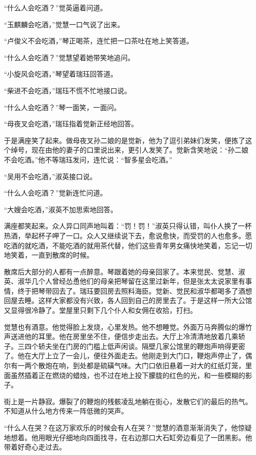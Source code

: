 \par “什么人会吃酒？”觉英逼着问道。
\par “玉麒麟会吃酒，”觉慧一口气说了出来。
\par “卢俊义不会吃酒，”琴正喝茶，连忙把一口茶吐在地上笑答道。
\par “什么人会吃酒？”觉慧望着她带笑地追问。
\par “小旋风会吃酒，”琴望着瑞珏回答道。
\par “柴进不会吃酒，”瑞珏不慌不忙地接口说。
\par “什么人会吃酒？”琴一面笑，一面问。
\par “母夜叉会吃酒，”瑞珏指着觉新正经地回答。
\par 于是满座笑了起来。做母夜叉孙二娘的是觉新，他为了逗引弟妹们发笑，便拣了这个绰号，现在由他的妻子的口里说出来，更引人发笑了。觉新含笑地说：“孙二娘不会吃酒。”他不等瑞珏发问，连忙说：“智多星会吃酒。”
\par “吴用不会吃酒，”淑英接口说。
\par “什么人会吃酒？”觉新连忙问道。
\par “大嫂会吃酒，”淑英不加思索地回答。
\par 满座都笑起来。众人异口同声地叫着：“罚！罚！”淑英只得认错，叫仆人换了一杯热酒，举起杯子呷了一口。众人又继续说下去，愈说愈快，而受罚的人也愈多。愿吃酒的就吃酒，不能吃酒的就用茶代替，他们这些青年男女痛快地笑着，忘记一切地笑着，一直到散席的时候。
\par 散席后大部分的人都有一点醉意。琴跟着她的母亲回家了。本来觉民、觉慧、淑英、淑华几个人曾经怂恿他们的母亲把琴留在这里过新年，但是张太太说家里有事情，终于把琴带回去了。瑞珏要回房去照料海臣。觉新、觉民和淑华都喝多了酒想回屋去睡。这样大家都没有兴致，各人回到自己的房里去了。于是这样一所大公馆又显得很冷静了。堂屋里只剩下几个仆人和女佣在收拾，打扫。
\par 觉慧也有酒意。他觉得脸上发烧，心里发热。他不想睡觉。外面万马奔腾似的爆竹声送进他的耳里。他在房里坐不住，便信步走出去。大厅上冷清清地放着几乘轿子。三四个轿夫坐在门房的门槛上低声闲谈。隔壁几家公馆里的鞭炮声响得更密了。他在大厅上立了一会儿，便往外面走去。他刚走到大门口，鞭炮声停止了，偶尔有一两个散炮在响，到处都是硫磺气味。大门口依旧悬着一对大的红纸灯笼，里面虽然插着正在燃烧的蜡烛，也不过在地上投下朦胧的红色的光，和一些模糊的影子。
\par 街上是一片静寂。爆裂了的鞭炮的残骸凌乱地躺在街心，发散它们的最后的热气。不知道从什么地方传来一阵低微的哭声。
\par “什么人在哭？在这万家欢乐的时候会有人在哭？”觉慧的酒意渐渐消失了，他惊疑地想着。他用眼光仔细地向四面找寻，在右边那口大石缸旁边看见了一团黑影。他带着好奇心走过去。
